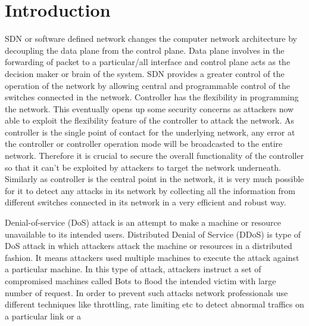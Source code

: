 \documentclass[conference]{IEEEtran}
\begin{document}
%
\IEEEpeerreviewmaketitle



\section{\textbf{Introduction}}
SDN or software defined network changes the computer network architecture by decoupling the data plane from the control plane. Data plane involves in the forwarding of packet to a particular/all interface and control plane acts as the decision maker or brain of the system. SDN provides a greater control of the operation of the network by allowing central and programmable control of the switches connected in the network. Controller has the flexibility in programming the network. This eventually opens up some security concerns as attackers now able to exploit the flexibility feature of the controller to attack the network. As controller is the single point of contact for the underlying network, any error at the controller or controller operation mode will be broadcasted to the entire network. Therefore it is crucial to secure the overall functionality of the controller so that it can’t be exploited by attackers to target the network underneath. Similarly as controller is the central point in the network, it is very much possible for it to detect any attacks in its network by collecting all the information from different switches connected in its network in a very efficient and robust way.
\par
Denial-of-service (DoS) attack is an attempt to make a machine or resource unavailable to its intended users. Distributed Denial of Service (DDoS) is type of DoS attack in which attackers attack the machine or resources in a distributed fashion. It means attackers used multiple machines to execute the attack against a particular machine. In this type of attack, attackers instruct a set of compromised machines called Bots to flood the intended victim with large number of request. In order to prevent such attacks network professionals use different techniques like throttling, rate limiting etc to detect abnormal traffics on a particular link or a
\end{document}
